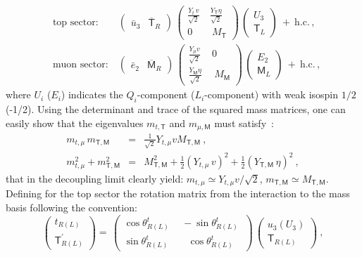 \begin{eqnarray}
	\label{eq:Mixing_Partner}
	& \textrm{top sector:} & \ 
	\left(  \begin{array}{cc}
		\bar{u}_3 & \overline{\mathsf{T}}_R
	\end{array} \right) \, \begin{pmatrix}
		\frac{Y_t  \, v}{\sqrt{2}} \ &  \frac{Y_{\mathsf{T}} \eta}{\sqrt{2}} \ \\
		0 \ & \ M_\mathsf{T}
	\end{pmatrix} \,
	\left(  \begin{array}{c}
		U_3 \\  \mathsf{T}_L
	\end{array} \right) \ + \ \mathrm{h.c.} \, , \\
	& \textrm{muon sector:} & \ 
	\left(  \begin{array}{cc}
		\bar{e}_2 & \overline{\mathsf{M}}_{R}
	\end{array} \right) \, \begin{pmatrix}
		\frac{Y_\mu v}{\sqrt{2}} \ & 0\ \\
		\frac{Y_{\mathsf{M}} \eta }{ \sqrt{2}}  \ & \ M_\mathsf{M}
	\end{pmatrix} \,
	\left(  \begin{array}{c}
		E_{2} \\  \mathsf{M}_L
	\end{array} \right) \ + \ \mathrm{h.c.} \, , \nonumber
\end{eqnarray}
where $U_{i}$ ($E_{i}$) indicates the $Q_{i}$-component ($L_{i}$-component) with weak isospin $1/2$ (-1/2). Using the determinant and trace of the squared mass matrices, one can easily show that the eigenvalues $m_{t,\mathsf{T}}$ and $m_{\mu,\mathsf{M}}$ must satisfy~\cite{Kamenik:2017tnu}:
\begin{eqnarray}
	\label{eq:Mass_Eigenvalues}
	m_{t,\mu} \,  m_{\mathsf{T,M}} & = & \frac{1}{\sqrt{2}} Y_{t,\mu} v M_{\mathsf{T,M}} \ , \\ m_{t,\mu}^2 + m_{\mathsf{T,M}}^2 & = & 
	M_{\mathsf{T,M}}^2 + \frac{1}{2} (Y_{t,\mu} \, v)^2 + \frac{1}{2} (Y_{\mathsf{T,M}} \, \eta)^2 \ , \nonumber
\end{eqnarray}
that in the decoupling limit clearly yield: $m_{t,\mu} \simeq Y_{t,\mu} v / \sqrt{2}$, $m_{\mathsf{T,M}} \simeq M_{\mathsf{T,M}}$.
Defining for the top sector the rotation matrix from the interaction to the mass basis following the convention:
\begin{equation}
	\label{eq:rot_phys_states} 
	\left(  \begin{array}{c}
		t_{R (L)} \\  \mathsf{T}^{\prime}_{R (L)}
	\end{array} \right) = \,
	\begin{pmatrix}
		\cos \theta^{t}_{R(L)} \ & \ - \sin \theta^{t}_{R(L)} \ \\
		\sin \theta^{t}_{R(L)}  \ & \ \ \ \, \cos \theta^{t}_{R(L)}
	\end{pmatrix} \,
	\left(  \begin{array}{c}
		u_{3} (U_{3}) \\  
		\mathsf{T}_{R (L)}
	\end{array} \right) \ ,
\end{equation}
